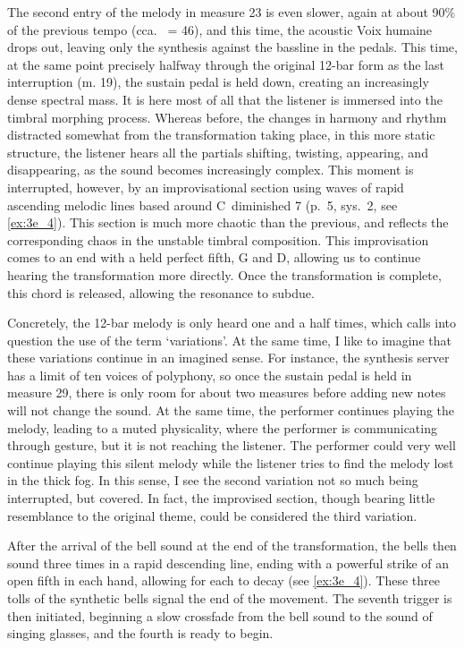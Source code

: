 \documentclass[12pt,twoside,maitrise]{dms_ks}
\theoremstyle{definition}
\begin{document}
{The second entry of the melody in measure 23 is even slower, again at about 90\% of the previous tempo (cca. 
\musQuarter\ = 46), and this time, the acoustic Voix humaine drops out, leaving only the synthesis against the bassline in the pedals. 
This time, at the same point precisely halfway through the original 12-bar form as the last interruption (m. 
19), the sustain pedal is held down, creating an increasingly dense spectral mass. 
It is here most of all that the listener is immersed into the timbral morphing process. 
Whereas before, the changes in harmony and rhythm distracted somewhat from the transformation taking place, in this more static structure, the listener hears all the partials shifting, twisting, appearing, and disappearing, as the sound becomes increasingly complex. 
This moment is interrupted, however, by an improvisational section using waves of rapid ascending melodic lines based around C\sh\ diminished 7 (p.~5, sys.~2, see \cref{ex:3e_4}). 
This section is much more chaotic than the previous, and reflects the corresponding chaos in the unstable timbral composition. 
This improvisation comes to an end with a held perfect fifth, G and D, allowing us to continue hearing the transformation more directly. 
Once the transformation is complete, this chord is released, allowing the resonance to subdue. 

Concretely, the 12-bar melody is only heard one and a half times, which calls into question the use of the term `variations'. 
At the same time, I like to imagine that these variations continue in an imagined sense. 
For instance, the synthesis server has a limit of ten voices of polyphony, so once the sustain pedal is held in measure 29, there is only room for about two measures before adding new notes will not change the sound. 
At the same time, the performer continues playing the melody, leading to a muted physicality, where the performer is communicating through gesture, but it is not reaching the listener. 
The performer could very well continue playing this silent melody while the listener tries to find the melody lost in the thick fog. 
In this sense, I see the second variation not so much being interrupted, but covered. 
In fact, the improvised section, though bearing little resemblance to the original theme, could be considered the third variation.

After the arrival of the bell sound at the end of the transformation, the bells then sound three times in a rapid descending line, ending with a powerful strike of an open fifth in each hand, allowing for each to decay (see \cref{ex:3e_4}). 
These three tolls of the synthetic bells signal the end of the movement. 
The seventh trigger is then initiated, beginning a slow crossfade from the bell sound to the sound of singing glasses, and the fourth is ready to begin.

}
\end{document}
